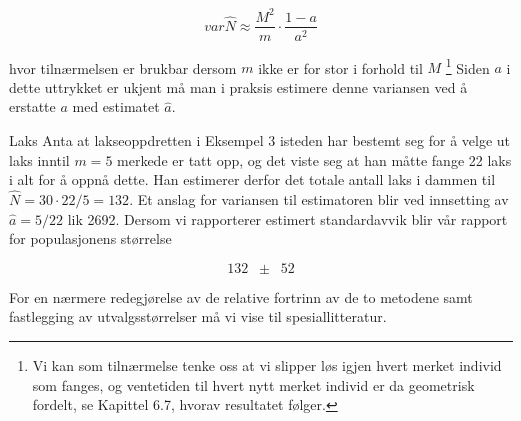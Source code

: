 \[ var\hat{N} \approx \frac{M^2}{m} \cdot \frac{1-a}{a^2}    \]

\noindent hvor tilnærmelsen er brukbar dersom $m$ ikke er for stor i
forhold til $M$ \footnote{Vi kan som tilnærmelse tenke oss at vi
slipper løs
igjen hvert merket individ som fanges, og ventetiden til hvert nytt merket 
individ er da geometrisk fordelt, se Kapittel 6.7, hvorav resultatet 
følger.}  Siden $a$ i dette uttrykket er ukjent må man i praksis
estimere denne variansen ved å erstatte $a$ med estimatet $\hat{a}$.\\

\begin{eksempel}{Laks}
Anta at lakseoppdretten i Eksempel 3 isteden har bestemt seg for å
velge ut laks inntil $m = 5$ merkede er tatt opp, og det viste seg at han
måtte fange 22 laks i alt for å oppnå dette.  Han estimerer
derfor det totale antall laks i dammen til $\hat{N} = 30 \cdot 22/5 =
132$.  Et anslag for variansen til estimatoren blir ved innsetting av
$\hat{a} =5/22$ lik 2692.  Dersom vi rapporterer estimert standardavvik
blir vår rapport for populasjonens størrelse

\[   132 \;\; \pm \;\; 52                           \]

\noindent For en nærmere redegjørelse av de relative fortrinn av de to
metodene samt fastlegging av utvalgsstørrelser må vi vise til 
spesiallitteratur.
\end{eksempel}


